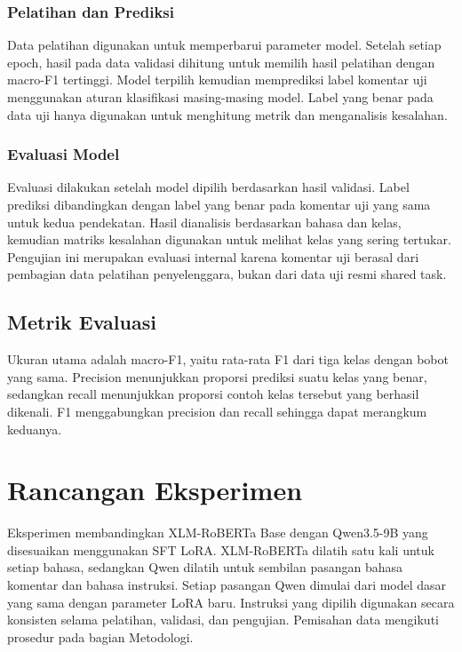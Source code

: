 \documentclass[11pt]{article}
\begin{document}
\subsubsection{Pelatihan dan Prediksi}
Data pelatihan digunakan untuk memperbarui parameter model. Setelah setiap epoch, hasil pada data validasi dihitung untuk memilih hasil pelatihan dengan macro-F1 tertinggi. Model terpilih kemudian memprediksi label komentar uji menggunakan aturan klasifikasi masing-masing model. Label yang benar pada data uji hanya digunakan untuk menghitung metrik dan menganalisis kesalahan.

\subsubsection{Evaluasi Model}
Evaluasi dilakukan setelah model dipilih berdasarkan hasil validasi. Label prediksi dibandingkan dengan label yang benar pada komentar uji yang sama untuk kedua pendekatan. Hasil dianalisis berdasarkan bahasa dan kelas, kemudian matriks kesalahan digunakan untuk melihat kelas yang sering tertukar. Pengujian ini merupakan evaluasi internal karena komentar uji berasal dari pembagian data pelatihan penyelenggara, bukan dari data uji resmi shared task.

\subsection{Metrik Evaluasi}
Ukuran utama adalah macro-F1, yaitu rata-rata F1 dari tiga kelas dengan bobot yang sama. Precision menunjukkan proporsi prediksi suatu kelas yang benar, sedangkan recall menunjukkan proporsi contoh kelas tersebut yang berhasil dikenali. F1 menggabungkan precision dan recall sehingga dapat merangkum keduanya.

\section{Rancangan Eksperimen}
Eksperimen membandingkan XLM-RoBERTa Base dengan Qwen3.5-9B yang disesuaikan menggunakan SFT LoRA. XLM-RoBERTa dilatih satu kali untuk setiap bahasa, sedangkan Qwen dilatih untuk sembilan pasangan bahasa komentar dan bahasa instruksi. Setiap pasangan Qwen dimulai dari model dasar yang sama dengan parameter LoRA baru. Instruksi yang dipilih digunakan secara konsisten selama pelatihan, validasi, dan pengujian. Pemisahan data mengikuti prosedur pada bagian Metodologi.
\end{document}
